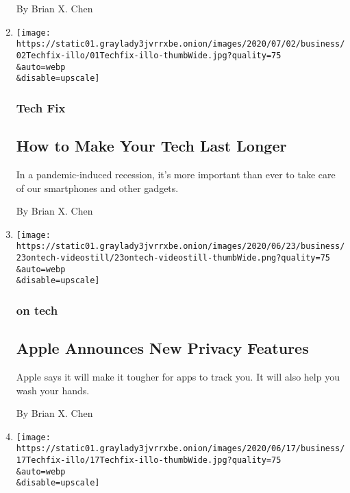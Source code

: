 \begin{enumerate}
  By Brian X. Chen
\item
  \href{/2020/07/01/technology/personaltech/make-your-tech-last-longer.html}{}

  \texttt{[image: https://static01.graylady3jvrrxbe.onion/images/2020/07/02/business/02Techfix-illo/01Techfix-illo-thumbWide.jpg?quality=75\\\&auto=webp\\\&disable=upscale]}

  \hypertarget{tech-fix-3}{%
  \subsubsection{Tech Fix}\label{tech-fix-3}}

  \hypertarget{how-to-make-your-tech-last-longer}{%
  \subsection{How to Make Your Tech Last
  Longer}\label{how-to-make-your-tech-last-longer}}

  In a pandemic-induced recession, it's more important than ever to take
  care of our smartphones and other gadgets.

  By Brian X. Chen
\item
  \href{/2020/06/23/technology/apple-announces-new-privacy-features.html}{}

  \texttt{[image: https://static01.graylady3jvrrxbe.onion/images/2020/06/23/business/23ontech-videostill/23ontech-videostill-thumbWide.png?quality=75\\\&auto=webp\\\&disable=upscale]}

  \hypertarget{on-tech}{%
  \subsubsection{on tech}\label{on-tech}}

  \hypertarget{apple-announces-new-privacy-features}{%
  \subsection{Apple Announces New Privacy
  Features}\label{apple-announces-new-privacy-features}}

  Apple says it will make it tougher for apps to track you. It will also
  help you wash your hands.

  By Brian X. Chen
\item
  \href{/2020/06/17/technology/personaltech/hey-email-service-screening.html}{}

  \texttt{[image: https://static01.graylady3jvrrxbe.onion/images/2020/06/17/business/17Techfix-illo/17Techfix-illo-thumbWide.jpg?quality=75\\\&auto=webp\\\&disable=upscale]}


\end{enumerate}
